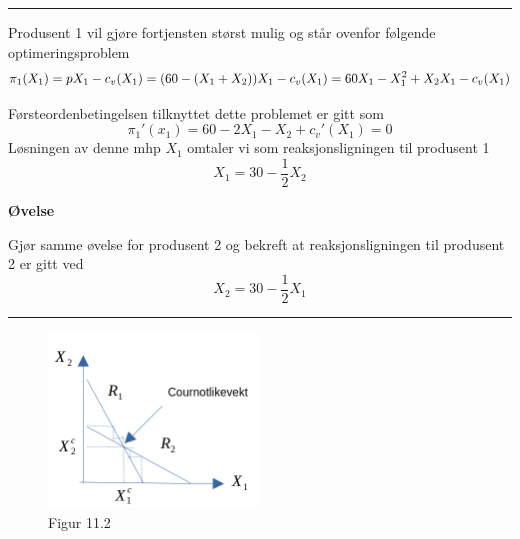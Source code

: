 \documentclass[
  letterpaper,
  DIV=11,
  numbers=noendperiod]{scrartcl}
\begin{document}
\begin{center}\rule{0.5\linewidth}{0.5pt}\end{center}

Produsent 1 vil gjøre fortjensten størst mulig og står ovenfor følgende
optimeringsproblem \begin{equation}
\pi_{1}(X_{1}) = pX_{1} - c_v(X_{1}) = \\ 
(60-(X_{1}+X_{2}))X_{1} - c_v(X_{1})= 60X_{1} - X_{1}^2+X_{2}X_{1}- c_v(X_{1}) 
\end{equation}

Førsteordenbetingelsen tilknyttet dette problemet er gitt som
\begin{equation}
\pi_{1}'(x_{1}) = 60-2X_{1}-X_{2} + c_v'(X_{1})=0
\end{equation} Løsningen av denne mhp \(X_{1}\) omtaler vi som
reaksjonsligningen til produsent 1 \begin{equation}
X_{1} = 30 - \frac{1}{2}X_{2}  
\end{equation}

\textbf{Øvelse}

Gjør samme øvelse for produsent 2 og bekreft at reaksjonsligningen til
produsent 2 er gitt ved\\
\begin{equation}
X_{2} = 30 - \frac{1}{2}X_{1}  
\end{equation}

\begin{center}\rule{0.5\linewidth}{0.5pt}\end{center}

\begin{figure}[H]

{\centering \includegraphics[width=0.5\textwidth,height=\textheight]{drawio/cournotl.png}

}

\caption{Figur 11.2}

\end{figure}%
\end{document}
